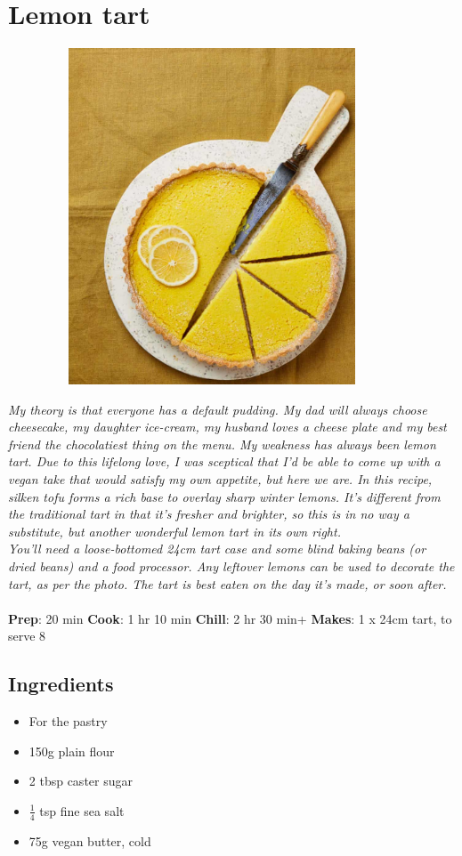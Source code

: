 \documentclass{book}
\begin{document}
\section{Lemon tart}
\begin{figure}
\centering\includegraphics[width=10cm,height=10cm,keepaspectratio]{Recipe_Pictures/Lemon_tart.png}
\end{figure}
\emph{My theory is that everyone has a default pudding. My dad will always choose cheesecake, my daughter ice-cream, my husband loves a cheese plate and my best friend the chocolatiest thing on the menu. My weakness has always been lemon tart. Due to this lifelong love, I was sceptical that I’d be able to come up with a vegan take that would satisfy my own appetite, but here we are. In this recipe, silken tofu forms a rich base to overlay sharp winter lemons. It’s different from the traditional tart in that it’s fresher and brighter, so this is in no way a substitute, but another wonderful lemon tart in its own right.\\ 
You’ll need a loose-bottomed 24cm tart case and some blind baking beans (or dried beans) and a food processor. Any leftover lemons can be used to decorate the tart, as per the photo. The tart is best eaten on the day it’s made, or soon after.}\\\\ 
\textbf{Prep}: 20 min
\textbf{Cook}: 1 hr 10 min
\textbf{Chill}: 2 hr 30 min+
\textbf{Makes}: 1 x 24cm tart, to serve 8
\subsection*{Ingredients}
\begin{itemize}
\item For the pastry
\item 150g plain flour
\item 2 tbsp caster sugar
\item $\frac{1}{4}$ tsp fine sea salt
\item 75g vegan butter, cold
\end{itemize}
\end{document}
